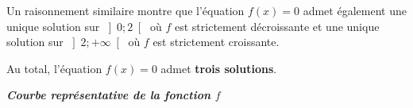 \begin{corrige}
\begin{enumerate}
          \par
          Un raisonnement similaire montre que l'équation $f\left(x\right)=0$ admet également une unique solution sur  $\left] 0 ; 2 \right[$ où $f$ est strictement décroissante et une unique solution sur  $\left] 2 ; +\infty  \right[$ où $f$ est strictement croissante.
          \par
          Au total, l'équation $f\left(x\right)=0$ admet \textbf{trois solutions}.
     \end{enumerate}
\begin{center}
 \begin{extern}%
   \end{extern}
\end{center}
\begin{center}\textit{\textbf{Courbe représentative de la fonction $f$}}\end{center}
\end{corrige}
